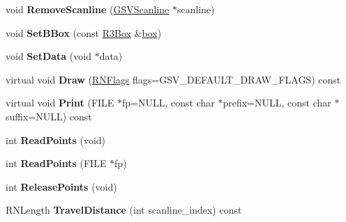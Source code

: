 \begin{DoxyCompactItemize}
\item 
void {\bfseries Remove\+Scanline} (\hyperlink{class_g_s_v_scanline}{G\+S\+V\+Scanline} $\ast$scanline)\hypertarget{class_g_s_v_scan_aa03b0d0e1ad8fe77a94c6467799e4bb4}{}\label{class_g_s_v_scan_aa03b0d0e1ad8fe77a94c6467799e4bb4}

\item 
void {\bfseries Set\+B\+Box} (const \hyperlink{class_r3_box}{R3\+Box} \&\hyperlink{structbox}{box})\hypertarget{class_g_s_v_scan_acf46388ded21da7c46f2c7f5ab66d528}{}\label{class_g_s_v_scan_acf46388ded21da7c46f2c7f5ab66d528}

\item 
void {\bfseries Set\+Data} (void $\ast$data)\hypertarget{class_g_s_v_scan_aaafb8fdec0a66305881a8d1c7b131928}{}\label{class_g_s_v_scan_aaafb8fdec0a66305881a8d1c7b131928}

\item 
virtual void {\bfseries Draw} (\hyperlink{class_r_n_flags}{R\+N\+Flags} flags=G\+S\+V\+\_\+\+D\+E\+F\+A\+U\+L\+T\+\_\+\+D\+R\+A\+W\+\_\+\+F\+L\+A\+GS) const \hypertarget{class_g_s_v_scan_a6a88aae808d71f873434859e50e9cccc}{}\label{class_g_s_v_scan_a6a88aae808d71f873434859e50e9cccc}

\item 
virtual void {\bfseries Print} (F\+I\+LE $\ast$fp=N\+U\+LL, const char $\ast$prefix=N\+U\+LL, const char $\ast$suffix=N\+U\+LL) const \hypertarget{class_g_s_v_scan_af45fbff9939e42d62c512aff4b7c0b3c}{}\label{class_g_s_v_scan_af45fbff9939e42d62c512aff4b7c0b3c}

\item 
int {\bfseries Read\+Points} (void)\hypertarget{class_g_s_v_scan_acc1cea60355c5d14fb9a61e23db1c553}{}\label{class_g_s_v_scan_acc1cea60355c5d14fb9a61e23db1c553}

\item 
int {\bfseries Read\+Points} (F\+I\+LE $\ast$fp)\hypertarget{class_g_s_v_scan_a9dffe8de039261c578530db92c2b215b}{}\label{class_g_s_v_scan_a9dffe8de039261c578530db92c2b215b}

\item 
int {\bfseries Release\+Points} (void)\hypertarget{class_g_s_v_scan_a69864be5991882e1b1ada3fccae107bf}{}\label{class_g_s_v_scan_a69864be5991882e1b1ada3fccae107bf}

\item 
R\+N\+Length {\bfseries Travel\+Distance} (int scanline\+\_\+index) const \hypertarget{class_g_s_v_scan_a585843f129be5cd5cf301b4aac15f3ea}{}\label{class_g_s_v_scan_a585843f129be5cd5cf301b4aac15f3ea}


\end{DoxyCompactItemize}
